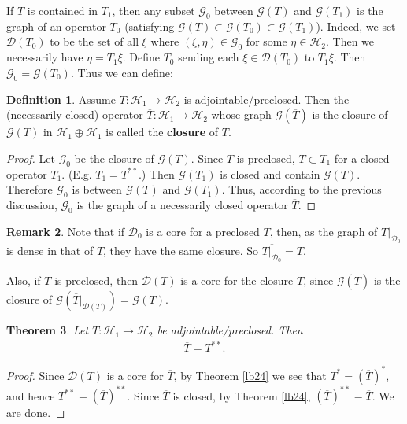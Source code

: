 \documentclass[12pt,a4paper,notitlepage]{article}
\theoremstyle{definition}
\newtheorem{df}{Definition}[section]
\newtheorem{rem}[df]{Remark}
\theoremstyle{plain}
\newtheorem{thm}[df]{Theorem}
\newcommand{\mc}{\mathcal}
\newcommand{\ovl}{\overline}
\newcommand{\Dom}{\scr D}
\newcommand{\scr}{\mathscr}
\numberwithin{equation}{section}
\begin{document}
If $T$ is contained in  $T_1$, then any subset $\scr G_0$  between $\scr G(T)$ and $\scr G(T_1)$ is the graph of an operator $T_0$ (satisfying $\scr G(T)\subset\scr G(T_0)\subset \scr G(T_1)$). Indeed, we set $\Dom(T_0)$ to be the set of all $\xi$ where $(\xi,\eta)\in\scr G_0$ for some $\eta\in\mc H_2$. Then we necessarily have $\eta=T_1\xi$. Define $T_0$ sending each $\xi\in\Dom(T_0)$ to $T_1\xi$. Then $\scr G_0=\scr G(T_0)$. Thus we can define:

\begin{df}
Assume $T:\mc H_1\rightarrow\mc H_2$ is adjointable/preclosed. Then the (necessarily closed) operator $\ovl T:\mc H_1\rightarrow\mc H_2$ \index{T@$\ovl T=T^{**}$} whose graph $\scr G(\ovl T)$ is the closure of $\scr G(T)$ in $\mc H_1\oplus \mc H_1$ is called the \textbf{closure} of $T$.
\end{df} 

\begin{proof}
Let $\scr G_0$ be the closure of $\scr G(T)$. Since $T$ is preclosed, $T\subset T_1$ for a closed operator $T_1$. (E.g. $T_1=T^{**}$.) Then $\scr G(T_1)$ is closed and contain $\scr G(T)$. Therefore $\scr G_0$ is between $\scr G(T)$ and $\scr G(T_1)$. Thus, according to the previous discussion, $\scr G_0$ is the graph of a necessarily closed operator $\ovl T$.
\end{proof}


\begin{rem}
Note that if $\scr D_0$ is a core for a preclosed $T$, then, as the graph of $T|_{\scr D_0}$ is dense in that of $T$, they have the same closure. So $\ovl{T|_{\scr D_0}}=\ovl T$. 

Also, if $T$ is preclosed, then $\Dom(T)$ is a core for the closure $\ovl T$, since $\scr G(\ovl T)$ is the closure of $\scr G(\ovl T|_{\Dom(T)})=\scr G(T)$.
\end{rem}


\begin{thm}
Let $T:\mc H_1\rightarrow\mc H_2$ be adjointable/preclosed. Then
\begin{align*}
\ovl T=T^{**}.	
\end{align*}
\end{thm}

\begin{proof}
Since $\Dom(T)$ is a core for $\ovl T$, by Theorem \ref{lb24} we see that $T^*=(\ovl T)^*$, and hence $T^{**}=(\ovl T)^{**}$. Since $\ovl T$ is closed, by Theorem \ref{lb24}, $(\ovl T)^{**}=\ovl T$. We are done. 
\end{proof}
\end{document}

